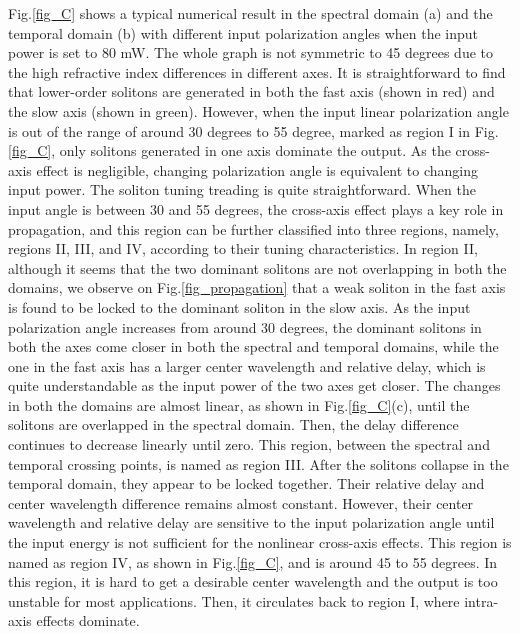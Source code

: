 \documentclass{osa-article}
\begin{document}
Fig.\ref{fig_C} shows a typical numerical result in the spectral domain (a) and the temporal domain (b) with different input polarization angles when the input power is set to 80 mW. The whole graph is not symmetric to 45 degrees due to the high refractive index differences in different axes. It is straightforward to find that lower-order solitons are generated in both the fast axis (shown in red) and the slow axis (shown in green). However, when the input linear polarization angle is out of the range of around 30 degrees to 55 degree, marked as region I in Fig.\ref{fig_C}, only solitons generated in one axis dominate the output. As the cross-axis effect is negligible, changing polarization angle is equivalent to changing input power. The soliton tuning treading is quite straightforward. When the input angle is between 30 and 55 degrees, the cross-axis effect plays a key role in propagation, and this region can be further classified into three regions, namely, regions II, III, and IV, according to their tuning characteristics. In region II, although it seems that the two dominant solitons are not overlapping in both the domains, we observe on Fig.\ref{fig_propagation} that a weak soliton in the fast axis is found to be locked to the dominant soliton in the slow axis. As the input polarization angle increases from around 30 degrees, the dominant solitons in both the axes come closer in both the spectral and temporal domains, while the one in the fast axis has a larger center wavelength and relative delay, which is quite understandable as the input power of the two axes get closer. The changes in both the domains are almost linear, as shown in Fig.\ref{fig_C}(c), until the solitons are overlapped in the spectral domain. Then, the delay difference continues to decrease linearly until zero. This region, between the spectral and temporal crossing points, is named as region III. After the solitons collapse in the temporal domain, they appear to be locked together. Their relative delay and center wavelength difference remains almost constant. However, their center wavelength and relative delay are sensitive to the input polarization angle until the input energy is not sufficient for the nonlinear cross-axis effects. This region is named as region IV, as shown in Fig.\ref{fig_C}, and is around 45 to 55 degrees. In this region, it is hard to get a desirable center wavelength and the output is too unstable for most applications. Then, it circulates back to region I, where intra-axis effects dominate.
\end{document}
